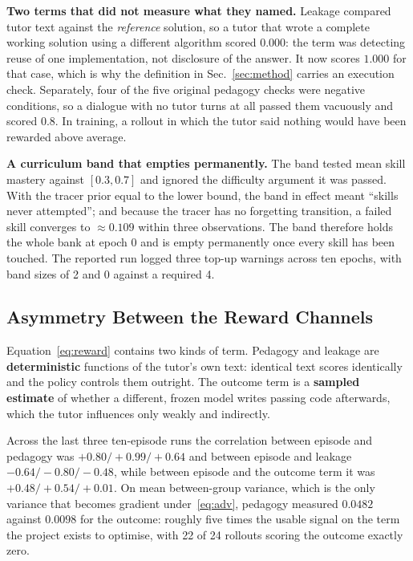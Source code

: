 \documentclass[conference]{IEEEtran}
\begin{document}
\textbf{Two terms that did not measure what they named.} Leakage compared
tutor text against the \emph{reference} solution, so a tutor that wrote a
complete working solution using a different algorithm scored $0.000$: the
term was detecting reuse of one implementation, not disclosure of the
answer. It now scores $1.000$ for that case, which is why the definition in
Sec.~\ref{sec:method} carries an execution check. Separately, four of the
five original pedagogy checks were negative conditions, so a dialogue with
no tutor turns at all passed them vacuously and scored $0.8$. In training,
a rollout in which the tutor said nothing would have been rewarded above
average.

\textbf{A curriculum band that empties permanently.} The band tested mean
skill mastery against $[0.3,0.7]$ and ignored the difficulty argument it
was passed. With the tracer prior equal to the lower bound, the band in
effect meant ``skills never attempted''; and because the tracer has no
forgetting transition, a failed skill converges to $\approx0.109$ within
three observations. The band therefore holds the whole bank at epoch 0 and
is empty permanently once every skill has been touched. The reported run
logged three top-up warnings across ten epochs, with band sizes of 2 and 0
against a required 4.

\subsection{Asymmetry Between the Reward Channels}
\label{sec:channel}

Equation~\eqref{eq:reward} contains two kinds of term. Pedagogy and leakage are
\textbf{deterministic} functions of the tutor's own text: identical text scores
identically and the policy controls them outright. The outcome term is a
\textbf{sampled estimate} of whether a different, frozen model writes passing
code afterwards, which the tutor influences only weakly and indirectly.

Across the last three ten-episode runs the correlation between episode and
pedagogy was $+0.80/+0.99/+0.64$ and between episode and leakage
$-0.64/-0.80/-0.48$, while between episode and the outcome term it was
$+0.48/+0.54/+0.01$. On mean between-group variance, which is the only variance
that becomes gradient under~\eqref{eq:adv}, pedagogy measured $0.0482$ against
$0.0098$ for the outcome: roughly five times the usable signal on the term the
project exists to optimise, with 22 of 24 rollouts scoring the outcome exactly
zero.
\end{document}
